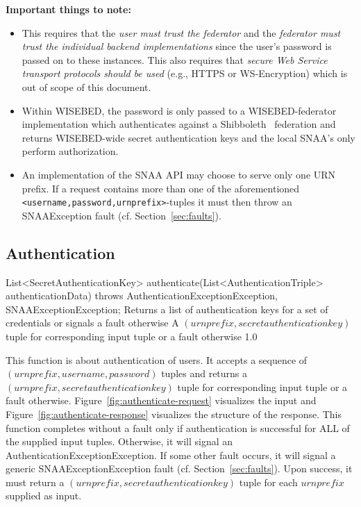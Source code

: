 \documentclass[a4paper,12pt]{article}
\begin{document}
{\bf Important things to note:}

\begin{itemize}

	\item This requires that the \emph{user must trust the federator} and the \emph{federator must trust the individual backend implementations} since the user's password is passed on to these instances. This also requires that \emph{secure Web Service transport protocols should be used} (e.g., HTTPS or WS-Encryption) which is out of scope of this document.

	\item Within WISEBED, the password is only passed to a WISEBED-federator implementation which authenticates against a Shibboleth~\cite{shibboleth} federation and returns WISEBED-wide secret authentication keys and the local SNAA's only perform authorization.

	\item An implementation of the SNAA API may choose to serve only one URN prefix. If a request contains more than one of the aforementioned \lstinline{<username,password,urnprefix>}-tuples it must then throw an SNAAException fault (cf. Section~\ref{sec:faults}).

\end{itemize}

\FloatBarrier

			\subsection{Authentication}
			\label{sec:authentication}

\begin{apidoc}
	{List<SecretAuthenticationKey> authenticate(List<AuthenticationTriple> authenticationData) throws AuthenticationExceptionException, SNAAExceptionException;} %
	{Returns a list of authentication keys for a set of credentials or signals a fault otherwise} %
	{
	} %
	{A $(urnprefix, secretauthenticationkey)$ tuple for corresponding input tuple or a fault otherwise} %
	{} %
	{1.0} %
\end{apidoc}

This function is about authentication of users. It accepts a sequence of $(urnprefix, username, password)$ tuples and returns a $(urnprefix, secretauthenticationkey)$ tuple for corresponding input tuple or a fault otherwise. Figure~\ref{fig:authenticate-request} visualizes the input and Figure~\ref{fig:authenticate-response} visualizes the structure of the response. This function completes without a fault only if authentication is successful for ALL of the supplied input tuples. Otherwise, it will signal an AuthenticationExceptionException. If some other fault occurs, it will signal a generic SNAAExceptionException fault (cf. Section~\ref{sec:faults}). Upon success, it must return a $(urnprefix, secretauthenticationkey)$ tuple for each $urnprefix$ supplied as input. 
\end{document}
